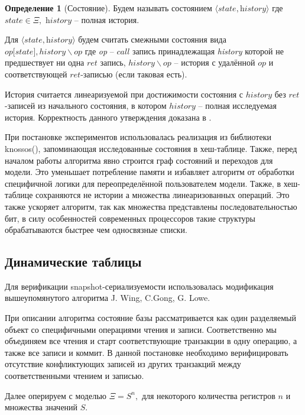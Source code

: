 \documentclass[pdftex,ptm,14pt,a4paper]{extreport}
\theoremstyle{definition}
\newtheorem{definition}{Определение}[chapter]
\begin{document}
\begin{definition}[Состояние]
    Будем называть состоянием $\langle \textit{state}, \textit{history} \rangle$ где
    $\textit{state} \in \Xi,$ $\textit{history}$ -- полная история.
\end{definition}

Для $\langle \textit{state}, \textit{history} \rangle$ будем считать смежными
состояния вида $op\lbrack state\rbrack, history \backslash op$ где
\textit{op} -- $call$ запись принадлежащая \textit{history} которой не предшествует ни одна
$ret$ запись, $history \backslash op$ -- история с удалённой $op$ и соответствующей $ret$-записью
(если таковая есть).

История считается линеаризуемой при достижимости состояния с $history$ без $ret$-записей из начального
состояния, в котором $history$ -- полная исследуемая история. Корректность данного утверждения
доказана в \cite{wing-testing}.

При постановке экспериментов использовалась реализация из библиотеки knossos(\cite{knossos}),
запоминающая исследованные состояния в хеш-таблице. Также, перед началом работы алгоритма явно строится
граф состояний и переходов для модели. Это уменьшает потребление памяти и
избавляет алгоритм от обработки специфичной логики для переопределённой пользователем модели.
Также, в хеш-таблице сохраняются не истории а множества линеаризованных операций. Это также ускоряет
алгоритм, так как множества представлены последовательностью бит, в силу особенностей современных процессоров
такие структуры обрабатываются быстрее чем односвязные списки.

\subsection{Динамические таблицы}
\label{dt-verify}
Для верификации snapshot-сериализуемости использовалась модификация вышеупомянутого алгоритма
J. Wing, C.Gong, G. Lowe.

При описании алгоритма состояние базы рассматривается как один разделяемый объект со специфичными
операциями чтения и записи. Соответственно мы объединяем все чтения и старт соответствующие транзакции в
одну операцию, а также все записи и коммит. В данной постановке необходимо верифицировать отсутствие конфликтующих
записей из других транзакций между соответственными чтением и записью.

Далее оперируем с моделью
$\Xi = S^n,$ для некоторого количества регистров $n$ и множества значений $S.$
\end{document}
